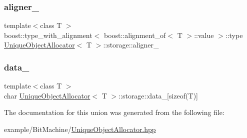 \subsubsection{\texorpdfstring{aligner\+\_\+}{aligner\_}}
{\footnotesize\ttfamily template$<$class T $>$ \\
boost\+::type\+\_\+with\+\_\+alignment$<$ boost\+::alignment\+\_\+of$<$ T $>$\+::value $>$\+::type \mbox{\hyperlink{class_unique_object_allocator}{Unique\+Object\+Allocator}}$<$ T $>$\+::storage\+::aligner\+\_\+}

\mbox{\label{union_unique_object_allocator_1_1storage_a47f94c663b1a8e6a80c265b8f62f7e75}} 
\subsubsection{\texorpdfstring{data\+\_\+}{data\_}}
{\footnotesize\ttfamily template$<$class T $>$ \\
char \mbox{\hyperlink{class_unique_object_allocator}{Unique\+Object\+Allocator}}$<$ T $>$\+::storage\+::data\+\_\+\mbox{[}sizeof(T)\mbox{]}}



The documentation for this union was generated from the following file\+:\begin{DoxyCompactItemize}
\item 
example/\+Bit\+Machine/\mbox{\hyperlink{_unique_object_allocator_8hpp}{Unique\+Object\+Allocator.\+hpp}}\end{DoxyCompactItemize}
